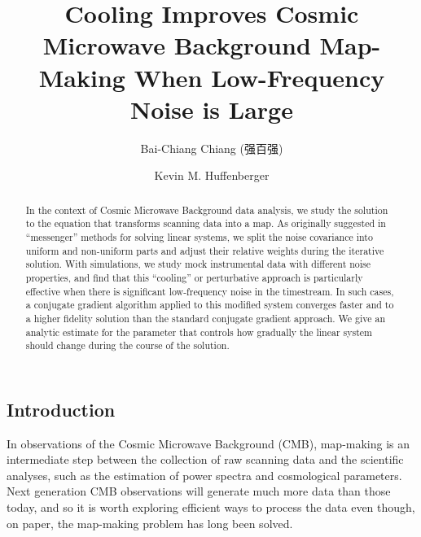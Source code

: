 \documentclass[twocolumn,linenumbers]{aastex631}
\begin{document}
\begin{CJK*}{UTF8}{gbsn}

\title{Cooling Improves Cosmic Microwave Background Map-Making When Low-Frequency Noise is Large}


\author[0000-0002-2981-4951]{Bai-Chiang Chiang (强百强)} 

\author[0000-0001-7109-0099]{Kevin M. Huffenberger}

 
\begin{abstract}

In the context of Cosmic Microwave Background data analysis, we study the solution to the equation that transforms scanning data into a map.
As originally suggested in ``messenger'' methods for solving linear systems, we split the  noise covariance into uniform and non-uniform parts and adjust their relative weights during the iterative solution.
With simulations, we study mock instrumental data with different noise properties, and find that this ``cooling'' or perturbative approach is particularly effective when there is significant low-frequency noise in the timestream.  In such cases, a conjugate gradient algorithm applied to this modified system converges faster and to a higher fidelity solution than the standard conjugate gradient approach. %
We give an analytic estimate for the parameter that controls how gradually the linear system should change during the course of the solution.

\end{abstract}


\section{Introduction} \label{sec:intro}


In observations of the Cosmic Microwave Background (CMB), map-making is an intermediate step between the collection of raw scanning data and the scientific analyses, such as the estimation of power spectra and cosmological parameters.
Next generation CMB observations will generate much more data than those today, and so
it is worth exploring efficient ways to process the data even though, on paper, the map-making problem has long been solved.


\end{CJK*}
\end{document}
